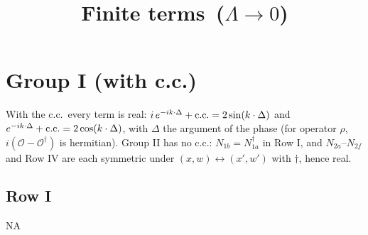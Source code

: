 \documentclass[9pt]{article}
\title{Finite terms\, ($\Lambda\to 0$)}
\author{}
\date{}
\numberwithin{equation}{section}
\begin{document}
\maketitle
\section{Group I (with c.c.)}
{\color{red}With the c.c.\ every term is real: $i\,e^{-ik\cdot\Delta}+{\rm c.c.}=2\sin(k\cdot\Delta)$ and $e^{-ik\cdot\Delta}+{\rm c.c.}=2\cos(k\cdot\Delta)$, with $\Delta$ the argument of the phase (for operator $\rho$, $i(\mathcal O-\mathcal O^{\dagger})$ is hermitian). Group II has no c.c.: $N_{1b}=N_{1a}^{\dagger}$ in Row I, and $N_{2a}$--$N_{2f}$ and Row IV are each symmetric under $(x,w)\leftrightarrow(x',w')$ with $\dagger$, hence real.}
\subsection{Row I}
\textsc{NA}
\end{document}
